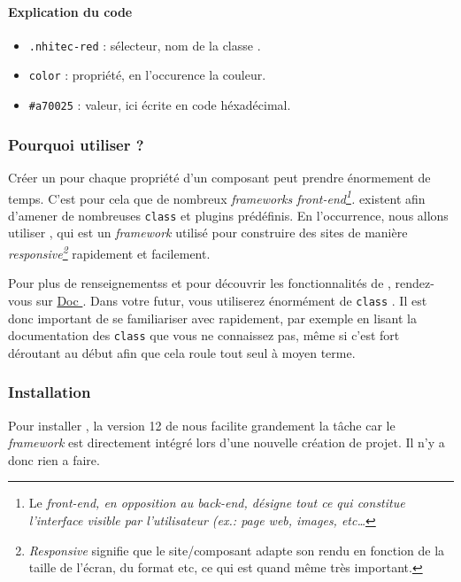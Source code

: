 \paragraph{Explication du code}
\begin{itemize}
    \item \verb|.nhitec-red| : sélecteur, nom de la classe \css{}.
    \item \verb|color| : propriété, en l'occurence la couleur.
    \item \verb|#a70025| : valeur, ici écrite en code héxadécimal.
\end{itemize}

\subsubsection[Pourquoi utiliser Tailwind?][fr.wikipedia.org/wiki/Tailwind\_CSS]{Pourquoi utiliser \tailwind{}?}
Créer un \css{} pour chaque propriété d'un composant peut prendre énormement de temps. C'est pour cela que de nombreux \textit{frameworks front-end\footnote{Le \textit{front-end, en opposition au back-end, désigne tout ce qui constitue l'interface visible par l'utilisateur (ex.: page web, images, etc\ldots}}.} existent afin d'amener de nombreuses \verb|class| et plugins \js{} prédéfinis. En l'occurrence, nous allons utiliser \tailwind{}, qui est un \textit{framework} utilisé pour construire des sites de manière \textit{responsive\footnote{\textit{Responsive} signifie que le site/composant adapte son rendu en fonction de la taille de l'écran, du format etc, ce qui est quand même très important.}} rapidement et facilement.

Pour plus de renseignementss et pour découvrir les fonctionnalités de \tailwind{}, rendez-vous sur \href{https://tailwindcss.com/docs}{Doc \tailwind{}}. Dans votre futur, vous utiliserez énormément de \verb|class| \tailwind. Il est donc important de se familiariser avec rapidement, par exemple en lisant la documentation des \verb|class| que vous ne connaissez pas, même si c'est fort déroutant au début afin que cela roule tout seul à moyen terme.

\subsubsection[Installation]{Installation}

Pour installer \tailwind{}, la version 12 de \laravel{} nous facilite grandement la tâche car le \textit{framework} est directement intégré lors d'une nouvelle création de projet. Il n'y a donc rien a faire.

